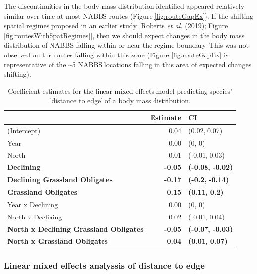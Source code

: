 \documentclass[12pt,twoside,openany]{reedthesis}
\begin{document}
The discontinuities in the body mass distribution identified appeared relatively similar over time at most NABBS routes (Figure \ref{fig:routeGapEx}). If the shifting spatial regimes proposed in an earlier study {[}Roberts \emph{et al.} (\protect\hyperlink{ref-roberts2019shifting}{2019}); Figure \ref{fig:routesWithSpatRegimes}{]}, then we should expect changes in the body mass distribution of NABBS falling within or near the regime boundary. This was not observed on the routes falling within this zone (Figure \ref{fig:routeGapEx} is representative of the \textasciitilde5 NABBS locations falling in this area of expected changes shifting).
\begin{table}[t]

\caption{\label{tab:lmeTab}Coefficient estimates for the linear mixed effects model predicting species' 'distance to edge' of a body mass distribution.}
\centering
\begin{tabular}{lrl}
\toprule
  & Estimate & CI\\
\midrule
(Intercept) & 0.04 & (0.02, 0.07)\\
Year & 0.00 & (0, 0)\\
North & 0.01 & (-0.01, 0.03)\\
\textbf{Declining} & \textbf{-0.05} & \textbf{(-0.08, -0.02)}\\
\textbf{Declining Grassland Obligates} & \textbf{-0.17} & \textbf{(-0.2, -0.14)}\\
\addlinespace
\textbf{Grassland Obligates} & \textbf{0.15} & \textbf{(0.11, 0.2)}\\
Year x Declining & 0.00 & (0, 0)\\
North x Declining & 0.02 & (-0.01, 0.04)\\
\textbf{North x Declining Grassland Obligates} & \textbf{-0.05} & \textbf{(-0.07, -0.03)}\\
\textbf{North x Grassland Obligates} & \textbf{0.04} & \textbf{(0.01, 0.07)}\\
\bottomrule
\end{tabular}
\end{table}
\hypertarget{linear-mixed-effects-analyssis-of-distance-to-edge}{%
\subsubsection{Linear mixed effects analyssis of distance to edge}\label{linear-mixed-effects-analyssis-of-distance-to-edge}}
\end{document}
